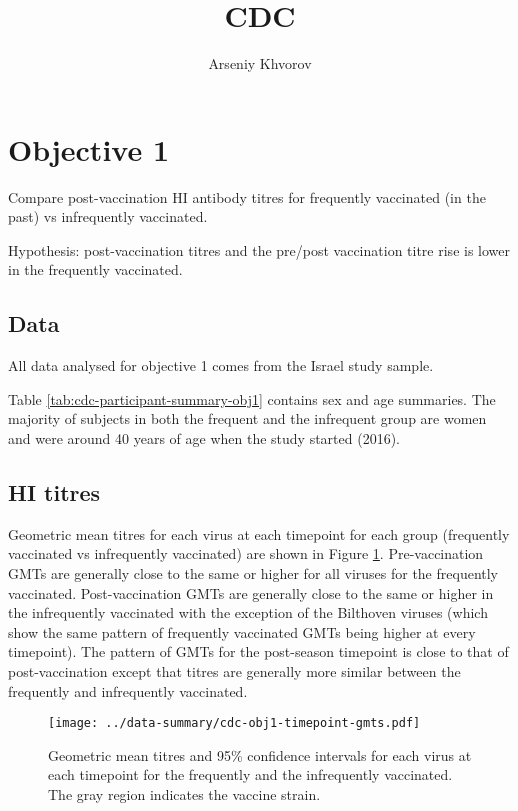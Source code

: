 \documentclass[12pt]{article}
\title{CDC}
\author{Arseniy Khvorov}
\begin{document}
\maketitle

\section{Objective 1}

Compare post-vaccination HI antibody titres for frequently vaccinated (in the past) vs infrequently vaccinated.

Hypothesis: post-vaccination titres and the pre/post vaccination titre rise
is lower in the frequently vaccinated.

\subsection{Data}

All data analysed for objective 1 comes from the Israel study sample.

Table \ref{tab:cdc-participant-summary-obj1} contains sex and age summaries.
The majority of subjects in both the frequent and the infrequent group are
women and were around 40 years of age when the study started (2016).



\subsection{HI titres}

Geometric mean titres for each virus at each timepoint for each group (frequently
vaccinated vs infrequently vaccinated) are shown in Figure
\ref{fig:cdc-obj1-timepoint-gmts}.
Pre-vaccination GMTs are generally close to the same
or higher for all viruses for the frequently vaccinated.
Post-vaccination GMTs are generally close to the same or higher in the infrequently vaccinated with
the exception of the Bilthoven viruses (which show the same pattern
of frequently vaccinated GMTs being higher at every
timepoint). The pattern of GMTs for the post-season timepoint is close to that
of post-vaccination except that titres are generally more similar between the
frequently and infrequently vaccinated.

\begin{figure}
	\texttt{[image: ../data-summary/cdc-obj1-timepoint-gmts.pdf]}
	\caption{Geometric mean titres and 95\% confidence intervals for each virus at each timepoint for the frequently and the infrequently vaccinated. The gray region indicates the vaccine strain.}
	\label{fig:cdc-obj1-timepoint-gmts}
\end{figure}
\end{document}
